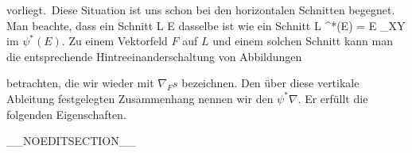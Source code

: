 vorliegt. Diese Situation ist uns schon bei den horizontalen Schnitten begegnet. Man beachte, dass ein Schnitt
 { L } { E
} {}
dasselbe ist wie ein Schnitt
 { L  } { \psi^*(E) = E \times_XY
} {}
im
$\psi^*(E)$. Zu einem Vektorfeld $F$ auf $L$ und einem solchen Schnitt kann man die entsprechende Hintreeinanderschaltung von Abbildungen

 {  }

betrachten, die wir wieder mit $\nabla_F s$ bezeichnen. Den über diese vertikale Ableitung festgelegten Zusammenhang nennen wir den   {}  $\psi^*\nabla$. Er erfüllt die folgenden Eigenschaften.

__NOEDITSECTION__

